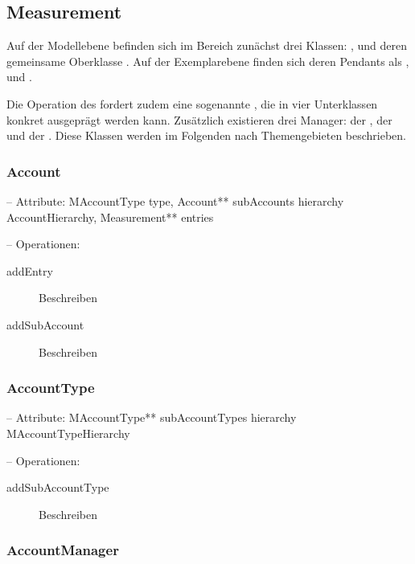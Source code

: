 \subsection{Measurement}

Auf der Modellebene befinden sich im Bereich  zunächst drei Klassen: , 
und deren gemeinsame Oberklasse . Auf der Exemplarebene finden sich deren Pendants als ,
 und .

Die Operation  des  fordert zudem eine sogenannte ,
die in vier Unterklassen konkret ausgeprägt werden kann.
Zusätzlich existieren drei Manager: der , der  und der .
Diese Klassen werden im Folgenden nach Themengebieten beschrieben.


\subsubsection{Account}


-- Attribute: MAccountType type, Account** subAccounts hierarchy AccountHierarchy, Measurement** entries

-- Operationen:

\begin{description}
	\item[addEntry] Beschreiben
	\item[addSubAccount] Beschreiben
\end{description}


\subsubsection{AccountType}


-- Attribute: MAccountType** subAccountTypes hierarchy MAccountTypeHierarchy

-- Operationen:

\begin{description}
	\item[addSubAccountType] Beschreiben
\end{description}


\subsubsection{AccountManager}

